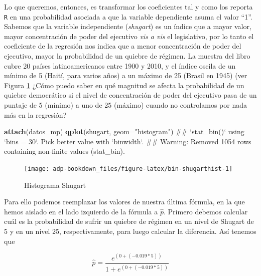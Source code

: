 \documentclass[]{book}
\newenvironment{Shaded}{\begin{snugshade}}{\end{snugshade}}
\newcommand{\KeywordTok}[1]{\textcolor[rgb]{0.13,0.29,0.53}{\textbf{#1}}}
\newcommand{\DataTypeTok}[1]{\textcolor[rgb]{0.13,0.29,0.53}{#1}}
\newcommand{\StringTok}[1]{\textcolor[rgb]{0.31,0.60,0.02}{#1}}
\newcommand{\NormalTok}[1]{#1}
\begin{document}
Lo que queremos, entonces, es transformar los coeficientes tal y como
los reporta \texttt{R} en una probabilidad asociada a que la variable
dependiente asuma el valor ``1''. Sabemos que la variable independiente
(\emph{shugart}) es un índice que a mayor valor, mayor concentración de
poder del ejecutivo \emph{vis a vis} el legislativo, por lo tanto el
coeficiente de la regresión nos indica que a menor concentración de
poder del ejecutivo, mayor la probabilidad de un quiebre de régimen. La
muestra del libro cubre 20 países latinoamericanos entre 1900 y 2010, y
el índice oscila de un mínimo de 5 (Haití, para varios años) a un máximo
de 25 (Brasil en 1945) (ver Figura \ref{fig:bin-shugarthist} ¿Cómo puedo
saber en qué magnitud se afecta la probabilidad de un quiebre
democrático si el nivel de concentración de poder del ejecutivo pasa de
un puntaje de 5 (mínimo) a uno de 25 (máximo) cuando no controlamos por
nada más en la regresión?

\begin{Shaded}
\begin{Highlighting}[]
\KeywordTok{attach}\NormalTok{(datos_mp)}
\KeywordTok{qplot}\NormalTok{(shugart, }\DataTypeTok{geom=}\StringTok{"histogram"}\NormalTok{) }
\NormalTok{## `stat_bin()` using `bins = 30`. Pick better value with `binwidth`.}
\NormalTok{## Warning: Removed 1054 rows containing non-finite values (stat_bin).}
\end{Highlighting}
\end{Shaded}

\begin{figure}

{\centering \texttt{[image: adp-bookdown\_files/figure-latex/bin-shugarthist-1]} 

}

\caption{Histograma Shugart}\label{fig:bin-shugarthist}
\end{figure}

Para ello podemos reemplazar los valores de nuestra última fórmula, en
la que hemos aislado en el lado izquierdo de la fórmula a \(\hat {p}\).
Primero debemos calcular cuál es la probabilidad de sufrir un quiebre de
régimen en un nivel de Shugart de 5 y en un nivel 25, respectivamente,
para luego calcular la diferencia. Así tenemos que

\[\hat{p} = \frac {e^{(0+(-0.019*5))}}{1 + e^{(0+(-0.019*5))}}
  \label{eq:bin-formreemp}\]
\end{document}
